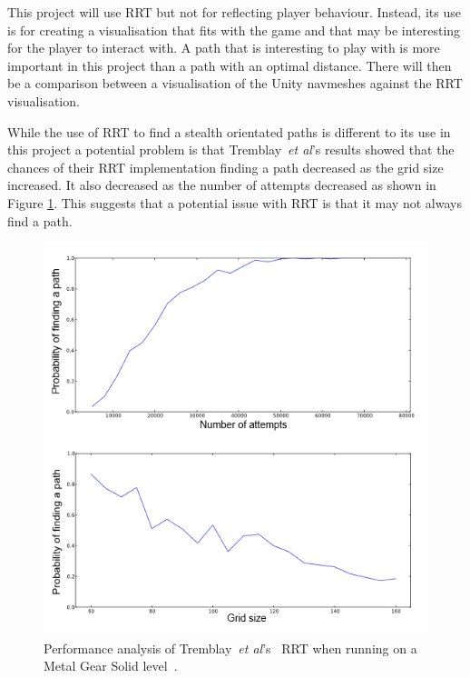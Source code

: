 \documentclass[journal]{IEEEtran}
\begin{document}
	This project will use RRT but not for reflecting player behaviour.  Instead, its use is for creating a visualisation that fits with the game and that may be interesting for the player to interact with. A path that is interesting to play with is more important in this project than a path with an optimal distance. There will then be a comparison between a visualisation of the Unity navmeshes against the RRT visualisation.
	
	While the use of RRT to find a stealth orientated paths is different to its use in this project a potential problem is that Tremblay~\textit{et al}'s results showed that the chances of their RRT implementation finding a path decreased as the grid size increased. It also decreased as the number of attempts decreased as shown in Figure \ref{TremblayRRT}.  This suggests that a potential issue with RRT is that it may not always find a path.
	
	\begin{figure}[h]
		\includegraphics[width=1.0\linewidth]{Tremblay2013.png}
		\caption{ Performance analysis of Tremblay~\textit{et al}'s~\cite{Tremblay2013} RRT when running on a Metal Gear Solid level~\cite{game:MetalGearSolid}.}
		\label{TremblayRRT}
	\end{figure} 
	
\end{document}
